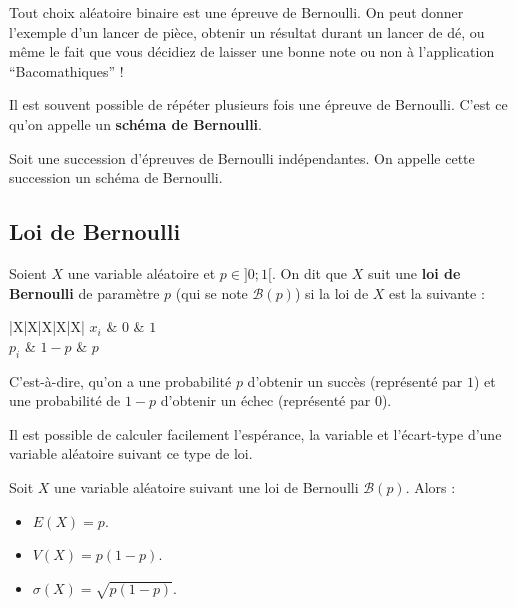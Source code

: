	\begin{tip}
		Tout choix aléatoire binaire est une épreuve de Bernoulli. On peut donner l'exemple d'un lancer de pièce, obtenir un résultat durant un lancer de dé, ou même le fait que vous décidiez de laisser une bonne note ou non à l'application ``Bacomathiques'' !
	\end{tip}

	Il est souvent possible de répéter plusieurs fois une épreuve de Bernoulli. C'est ce qu'on appelle un \textbf{schéma de Bernoulli}.

	\begin{formula}
		Soit une succession d'épreuves de Bernoulli indépendantes. On appelle cette succession un schéma de Bernoulli.
	\end{formula}

	\subsection{Loi de Bernoulli}

	\begin{formula}[Définition]
		Soient $X$ une variable aléatoire et $p \in ]0; 1[$. On dit que $X$ suit une \textbf{loi de Bernoulli} de paramètre $p$ (qui se note $\mathcal{B}(p)$) si la loi de $X$ est la suivante :
		\newpar
		\begin{whitetabularx}{|X|X|X|X|X|}
			\hline
			$x_i$ & $0$ & $1$ \\
			\hline
			$p_i$ & $1 - p$ & $p$ \\
			\hline
		\end{whitetabularx}
		\newpar
		C'est-à-dire, qu'on a une probabilité $p$ d'obtenir un succès (représenté par $1$) et une probabilité de $1-p$ d'obtenir un échec (représenté par $0$).
	\end{formula}

	Il est possible de calculer facilement l'espérance, la variable et l'écart-type d'une variable aléatoire suivant ce type de loi.

	\begin{formula}
		Soit $X$ une variable aléatoire suivant une loi de Bernoulli $\mathcal{B}(p)$. Alors :
		\begin{itemize}
			\item $E(X) = p$.
			\item $V(X) = p(1-p)$.
			\item $\sigma(X) = \sqrt{p(1-p)}$.
		\end{itemize}
	\end{formula}

